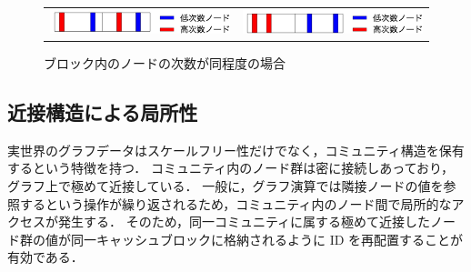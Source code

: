\begin{figure}[t]
  \begin{tabular}{cc}
    \begin{minipage}[t]{0.45\hsize}
      \centering
      \includegraphics[width=7cm]{./figure/bad_degree_cache.pdf}
      \caption{ブロック内のノードの次数に差がある場合}
      \label{bad_degree_cache}
    \end{minipage} &
    \begin{minipage}[t]{0.45\hsize}
      \centering
      \includegraphics[width=7cm]{./figure/good_degree_cache.pdf}
      \caption{ブロック内のノードの次数が同程度の場合}
      \label{good_degree_cache}
    \end{minipage}
  \end{tabular}
\end{figure}

\subsection{近接構造による局所性}
実世界のグラフデータはスケールフリー性だけでなく，コミュニティ構造を保有するという特徴を持つ\cite{girvan2002community,leskovec2009community}．
コミュニティ内のノード群は密に接続しあっており，グラフ上で極めて近接している．
一般に，グラフ演算では隣接ノードの値を参照するという操作が繰り返されるため，コミュニティ内のノード間で局所的なアクセスが発生する．
そのため，同一コミュニティに属する極めて近接したノード群の値が同一キャッシュブロックに格納されるように ID を再配置することが有効である．

